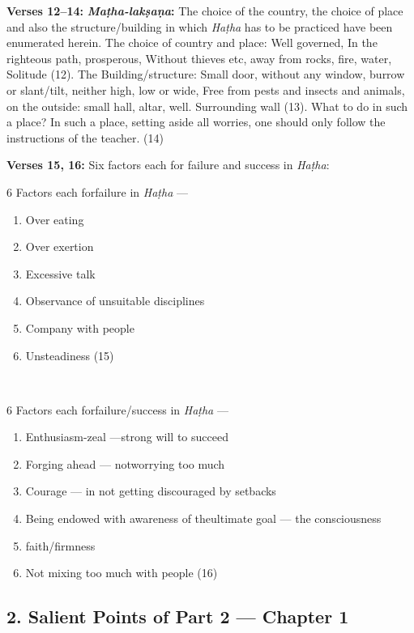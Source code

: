 \textbf{Verses 12--14:} \textbf{\textit{Maṭha-lakṣaṇa}:} The choice of the country, the choice of place and also the structure/building in which \textit{Haṭha} has to be practiced have been enumerated herein.  The choice of country and place: Well governed, In the righteous path, prosperous, Without thieves etc, away from rocks, fire, water, Solitude (12). The Building/structure: Small door, without any window, burrow or slant/tilt, neither high, low or wide, Free from pests and insects and animals, on the outside: small hall, altar, well. Surrounding wall (13). What to do in such a place?  In such a place, setting aside all worries, one should only follow the instructions of the teacher. (14)

\newpage

\textbf{Verses 15, 16:} Six factors each for failure and success in \textit{Haṭha}: 

\noindent
\begin{minipage}[t]{.45\linewidth}
6 Factors each for\break failure in \textit{Haṭha} ---
\begin{enumerate}
\item Over eating 
\item Over exertion 
\item Excessive talk
\item Observance of unsuitable disciplines 
\item Company with people 
\item Unsteadiness  (15)
\end{enumerate}
\end{minipage}
\smallskip~
\begin{minipage}[t]{.45\linewidth}
6 Factors each for\break failure/success in \textit{Haṭha} ---
\begin{enumerate}
\item Enthusiasm-zeal ---\hfil\break  strong will to succeed 
\item Forging ahead --- not\break worrying too much 
\item Courage --- in not getting discouraged by setbacks
\item Being  endowed with awareness of the\break ultimate goal --- the consciousness  
\item faith/firmness 
\item Not mixing too much with people (16) 
\end{enumerate}
\end{minipage}

\subsection*{2. Salient Points of Part 2 --- Chapter 1}

